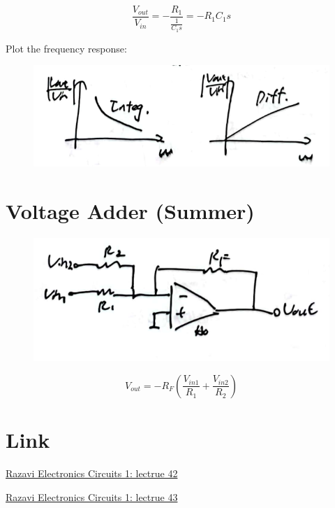 \documentclass[fontset=windows]{article}
\begin{document}
$$\frac{V_{out}}{V_{in}}=-\frac{R_1}{\frac{1}{C_1s}}=-R_1C_1s$$

Plot the frequency response: 

\begin{figure}[htbp]
    \centering
    \includegraphics[scale=0.8]{17.jpg}
    \captionsetup{labelformat=empty}
    \caption{}
    \label{17}
\end{figure}

\section*{Voltage Adder (Summer)}

\begin{figure}[htbp]
    \centering
    \includegraphics[scale=0.8]{18.jpg}
    \captionsetup{labelformat=empty}
    \caption{}
    \label{18}
\end{figure}

$$V_{out}=-R_F(\frac{V_{in1}}{R_1}+\frac{V_{in2}}{R_2})$$

\section*{Link}

\href{https://www.bilibili.com/video/BV1FD4y1R7Ah?p=42&vd_source=1d0c07486a3bd3b0adb8ac548bf6453e}{Razavi Electronics Circuits 1: lectrue 42}

\href{https://www.bilibili.com/video/BV1FD4y1R7Ah?p=43&vd_source=1d0c07486a3bd3b0adb8ac548bf6453e}{Razavi Electronics Circuits 1: lectrue 43}
\end{document}
